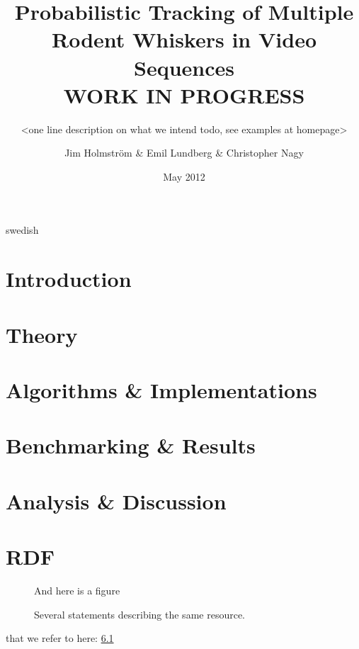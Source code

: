 \documentclass[a4paper,11pt]{kth-mag}
\title{
    Probabilistic Tracking of Multiple Rodent Whiskers in Video Sequences
    \\WORK IN PROGRESS
}
\subtitle{
    <one line description on what we intend todo, see examples at homepage> 
}
\author{
    Jim Holmstr\"{o}m \& 
    Emil Lundberg \& 
    Christopher Nagy
}
\date{May 2012}
\begin{document}
\frontmatter
\pagestyle{empty}
\removepagenumbers
\maketitle
{}
\begin{abstract}
    
\end{abstract}
\clearpage
\begin{foreignabstract}{swedish}
    
\end{foreignabstract}
\clearpage
\tableofcontents*
\mainmatter
\pagestyle{newchap}
\chapter{Introduction}
    \label{sec:introduction}
    

\chapter{Theory}
    \label{sec:theory}
    

\chapter{Algorithms \& Implementations}
    \label{sec:algorithms_implementations}
    


\chapter{Benchmarking \& Results}
    \label{sec:benchmarks_results}
    

\chapter{Analysis \& Discussion}
    \label{sec:analysis_discussion}
    


\appendix
\addappheadtotoc

\chapter{RDF}\label{appA}


\begin{figure}[ht]
\begin{center}
And here is a figure
\caption{\small{Several statements describing the same resource.}}\label{RDF_4}
\end{center}
\end{figure}

that we refer to here: \ref{RDF_4}
\end{document}
